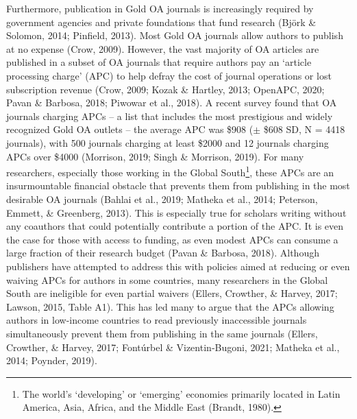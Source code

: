 \documentclass[
  english,
  man]{apa6}
\begin{document}
Furthermore, publication in Gold OA journals is increasingly required by government agencies and private foundations that fund research (Björk \& Solomon, 2014; Pinfield, 2013). Most Gold OA journals allow authors to publish at no expense (Crow, 2009). However, the vast majority of OA articles are published in a subset of OA journals that require authors pay an `article processing charge' (APC) to help defray the cost of journal operations or lost subscription revenue (Crow, 2009; Kozak \& Hartley, 2013; OpenAPC, 2020; Pavan \& Barbosa, 2018; Piwowar et al., 2018). A recent survey found that OA journals charging APCs -- a list that includes the most prestigious and widely recognized Gold OA outlets -- the average APC was \$908 (\(\pm\) \$608 SD, N = 4418 journals), with 500 journals charging at least \$2000 and 12 journals charging APCs over \$4000 (Morrison, 2019; Singh \& Morrison, 2019). For many researchers, especially those working in the Global South\footnote{The world's `developing' or `emerging' economies primarily located in Latin America, Asia, Africa, and the Middle East (Brandt, 1980).}, these APCs are an insurmountable financial obstacle that prevents them from publishing in the most desirable OA journals (Bahlai et al., 2019; Matheka et al., 2014; Peterson, Emmett, \& Greenberg, 2013). This is especially true for scholars writing without any coauthors that could potentially contribute a portion of the APC. It is even the case for those with access to funding, as even modest APCs can consume a large fraction of their research budget (Pavan \& Barbosa, 2018). Although publishers have attempted to address this with policies aimed at reducing or even waiving APCs for authors in some countries, many researchers in the Global South are ineligible for even partial waivers (Ellers, Crowther, \& Harvey, 2017; Lawson, 2015, Table A1). This has led many to argue that the APCs allowing authors in low-income countries to read previously inaccessible journals simultaneously prevent them from publishing in the same journals (Ellers, Crowther, \& Harvey, 2017; Fontúrbel \& Vizentin‐Bugoni, 2021; Matheka et al., 2014; Poynder, 2019).\\
\end{document}

